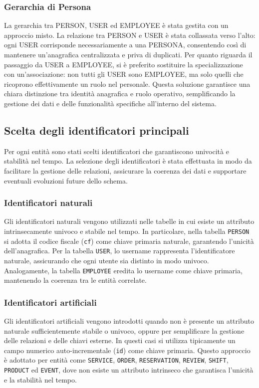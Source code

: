 \documentclass[a4paper,12pt]{report}
\begin{document}
\subsubsection{Gerarchia di Persona}
La gerarchia tra PERSON, USER ed EMPLOYEE è stata gestita con un
approccio misto. La relazione tra PERSON e USER è stata collassata
verso l'alto: ogni USER corrisponde necessariamente a una PERSONA,
consentendo così di mantenere un'anagrafica centralizzata e priva di
duplicati. Per quanto riguarda il passaggio da USER a EMPLOYEE, si è
preferito sostituire la specializzazione con un'associazione: non
tutti gli USER sono EMPLOYEE, ma solo quelli che ricoprono
effettivamente un ruolo nel personale. Questa soluzione garantisce
una chiara distinzione tra identità anagrafica e ruolo operativo,
semplificando la gestione dei dati e delle funzionalità specifiche
all'interno del sistema.

\subsection{Scelta degli identificatori principali}
Per ogni entità sono stati scelti identificatori che garantiscono
univocità e stabilità nel tempo. La selezione degli identificatori è
stata effettuata in modo da facilitare la gestione delle relazioni,
assicurare la coerenza dei dati e supportare eventuali evoluzioni
future dello schema.

\subsubsection{Identificatori naturali}
Gli identificatori naturali vengono utilizzati nelle tabelle in cui
esiste un attributo intrinsecamente univoco e stabile nel tempo. In
particolare, nella tabella \texttt{PERSON} si adotta il codice
fiscale (\texttt{cf}) come chiave primaria naturale, garantendo
l'unicità dell'anagrafica. Per la tabella \texttt{USER}, lo username
rappresenta l'identificatore naturale, assicurando che ogni utente
sia distinto in modo univoco. Analogamente, la tabella
\texttt{EMPLOYEE} eredita lo username come chiave primaria,
mantenendo la coerenza tra le entità correlate.

\subsubsection{Identificatori artificiali}
Gli identificatori artificiali vengono introdotti quando non è
presente un attributo naturale sufficientemente stabile o univoco,
oppure per semplificare la gestione delle relazioni e delle chiavi
esterne. In questi casi si utilizza tipicamente un campo numerico
auto-incrementale (\texttt{id}) come chiave primaria. Questo
approccio è adottato per entità come \texttt{SERVICE}, \texttt{ORDER},
\texttt{RESERVATION}, \texttt{REVIEW}, \texttt{SHIFT}, \texttt{PRODUCT}
ed \texttt{EVENT}, dove non esiste un attributo intrinseco che garantisca
l'unicità e la stabilità nel tempo.
\end{document}
